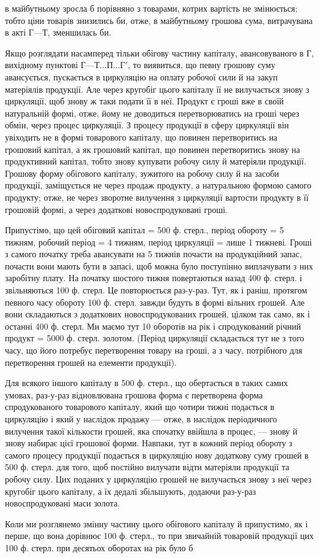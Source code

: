 \parcont{}  %
в майбутньому зросла б порівняно з товарами, котрих вартість не змінюється;
тобто ціни товарів знизились би, отже, в майбутньому грошова
сума, витрачувана в акті $Г — Т$, зменшилась би.

Якщо розглядати насамперед тільки обігову частину капіталу, авансовуваного
в Г, вихідному пунктові $Г — Т\dots{} П\dots{} Г'$, то виявиться, що певну
грошову суму авансується, пускається в циркуляцію на оплату робочої
сили й на закуп матеріялів продукції. Але через кругобіг цього капіталу
її не вилучається знову з циркуляції, щоб знову ж таки подати її
в неї. Продукт є гроші вже в своїй натуральній формі, отже, йому не
доводиться перетворюватись на гроші через обмін, через процес
циркуляції. З процесу продукції в сферу циркуляції він увіходить не в
формі товарового капіталу, що повинен перетворитись на грошовий капітал,
а як грошовий капітал, що повинен перетворитись знову на продуктивний
капітал, тобто знову купувати робочу силу й матеріяли продукції.
Грошову форму обігового капіталу, зужитого на робочу силу й на засоби
продукції, заміщується не через продаж продукту, а натуральною
формою самого продукту; отже, не через зворотне вилучення з циркуляції
вартости продукту в її грошовій формі, а через додаткові новоспродуковані
гроші.

Припустімо, що цей обіговий капітал = 500 ф. стерл., період обороту
= 5 тижням, робочий період = 4 тижням, період циркуляції = лише 1
тижневі. Гроші з самого початку треба авансувати на 5 тижнів почасти
на продукційний запас, почасти вони мають бути в запасі, щоб можна
було поступінно виплачувати з них заробітну плату. На початку шостого
тижня повертаються назад 400 ф. стерл. і звільняються 100 ф. стерл. Це
повторюється раз-у-раз. Тут, як і раніш, протягом певного часу обороту
100 ф. стерл. завжди будуть в формі вільних грошей. Але вони складаються
з додаткових новоспродукованих грошей, цілком так само, як і останні
400 ф. стерл. Ми маємо тут 10 оборотів на рік і спродукований річний
продукт = 5000 ф. стерл. золотом. (Період циркуляції складається тут
не з того часу, що його потребує перетворення товару на гроші, а з
часу, потрібного для перетворення грошей на елементи продукції).

Для всякого іншого капіталу в 500 ф. стерл., що обертається в таких
самих умовах, раз-у-раз відновлювана грошова форма є перетворена форма
спродукованого товарового капіталу, який що чотири тижні подається
в циркуляцію і який у наслідок продажу — отже, в наслідок періодичного
вилучення такої кількости грошей, яка спочатку ввійшла в процес, —
знову й знову набирає цієї грошової форми. Навпаки, тут в кожний період
обороту з самого процесу продукції подається в циркуляцію нову
додаткову суму грошей в 500 ф. стерл. для того, щоб постійно вилучати
відти матеріяли продукції та робочу силу. Цих поданих у циркуляцію
грошей не вилучається знову з неї через кругобіг цього капіталу, а їх
дедалі збільшують, додаючи раз-у-раз новоспродуковані маси золота.

Коли ми розглянемо змінну частину цього обігового капіталу й припустимо,
як і перше, що вона дорівнює 100 ф. стерл., то при звичайній
товаровій продукції цих 100 ф. стерл. при десятьох оборотах на рік було б
\parbreak{}  %
